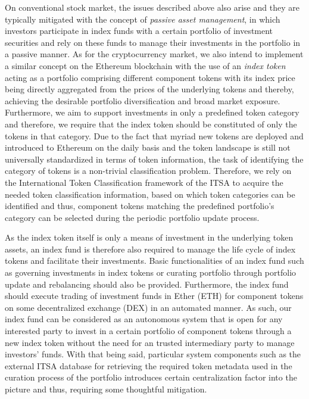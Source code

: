 On conventional stock market, the issues described above also arise and they are typically mitigated with the concept of \textit{passive asset management}, in which investors participate in index funds with a certain portfolio of investment securities and rely on these funds to manage their investments in the portfolio in a passive manner. As for the cryptocurrency market, we also intend to implement a similar concept on the Ethereum blockchain with the use of an \textit{index token} acting as a portfolio comprising different component tokens with its index price being directly aggregated from the prices of the underlying tokens and thereby, achieving the desirable portfolio diversification and broad market exposure. Furthermore, we aim to support investments in only a predefined token category and therefore, we require that the index token should be constituted of only the tokens in that category. Due to the fact that myriad new tokens are deployed and introduced to Ethereum on the daily basis and the token landscape is still not universally standardized in terms of token information, the task of identifying the category of tokens is a non-trivial classification problem. Therefore, we rely on the International Token Classification framework of the ITSA to acquire the needed token classification information, based on which token categories can be identified and thus, component tokens matching the predefined portfolio's category can be selected during the periodic portfolio update process.


As the index token itself is only a means of investment in the underlying token assets, an index fund is therefore also required to manage the life cycle of index tokens and facilitate their investments. Basic functionalities of an index fund such as governing investments in index tokens or curating portfolio through portfolio update and rebalancing should also be provided. Furthermore, the index fund should execute trading of investment funds in Ether (ETH) for component tokens on some decentralized exchange (DEX) in an automated manner. As such, our index fund can be considered as an autonomous system that is open for any interested party to invest in a certain portfolio of component tokens through a new index token without the need for an trusted intermediary party to manage investors' funds. With that being said, particular system components such as the external ITSA database for retrieving the required token metadata used in the curation process of the portfolio introduces certain centralization factor into the picture and thus, requiring some thoughtful mitigation.


